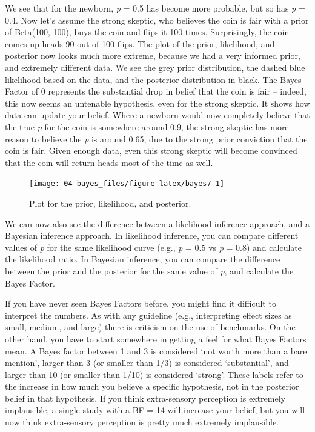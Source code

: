\documentclass[
]{krantz}
\begin{document}
We see that for the newborn, \emph{p} = 0.5 has become more probable, but so has \emph{p} = 0.4. Now let's assume the strong skeptic, who believes the coin is fair with a prior of Beta(100, 100), buys the coin and flips it 100 times. Surprisingly, the coin comes up heads 90 out of 100 flips. The plot of the prior, likelihood, and posterior now looks much more extreme, because we had a very informed prior, and extremely different data. We see the grey prior distribution, the dashed blue likelihood based on the data, and the posterior distribution in black. The Bayes Factor of 0 represents the substantial drop in belief that the coin is fair -- indeed, this now seems an untenable hypothesis, even for the strong skeptic. It shows how data can update your belief. Where a newborn would now completely believe that the true \emph{p} for the coin is somewhere around 0.9, the strong skeptic has more reason to believe the \emph{p} is around 0.65, due to the strong prior conviction that the coin is fair. Given enough data, even this strong skeptic will become convinced that the coin will return heads most of the time as well.

\begin{figure}

{\centering \texttt{[image: 04-bayes\_files/figure-latex/bayes7-1]} 

}

\caption{Plot for the prior, likelihood, and posterior.}\label{fig:bayes7}
\end{figure}

We can now also see the difference between a likelihood inference approach, and a Bayesian inference approach. In likelihood inference, you can compare different values of \emph{p} for the same likelihood curve (e.g., \emph{p} = 0.5 vs \emph{p} = 0.8) and calculate the likelihood ratio. In Bayesian inference, you can compare the difference between the prior and the posterior for the same value of \emph{p}, and calculate the Bayes Factor.

If you have never seen Bayes Factors before, you might find it difficult to interpret the numbers. As with any guideline (e.g., interpreting effect sizes as small, medium, and large) there is criticism on the use of benchmarks. On the other hand, you have to start somewhere in getting a feel for what Bayes Factors mean. A Bayes factor between 1 and 3 is considered `not worth more than a bare mention', larger than 3 (or smaller than 1/3) is considered `substantial', and larger than 10 (or smaller than 1/10) is considered `strong'. These labels refer to the increase in how much you believe a specific hypothesis, not in the posterior belief in that hypothesis. If you think extra-sensory perception is extremely implausible, a single study with a BF = 14 will increase your belief, but you will now think extra-sensory perception is pretty much extremely implausible.
\end{document}
